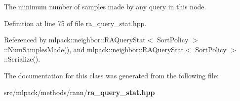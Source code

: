 The minimum number of samples made by any query in this node. 



Definition at line 75 of file ra\+\_\+query\+\_\+stat.\+hpp.



Referenced by mlpack\+::neighbor\+::\+R\+A\+Query\+Stat$<$ Sort\+Policy $>$\+::\+Num\+Samples\+Made(), and mlpack\+::neighbor\+::\+R\+A\+Query\+Stat$<$ Sort\+Policy $>$\+::\+Serialize().



The documentation for this class was generated from the following file\+:\begin{DoxyCompactItemize}
\item 
src/mlpack/methods/rann/{\bf ra\+\_\+query\+\_\+stat.\+hpp}\end{DoxyCompactItemize}
